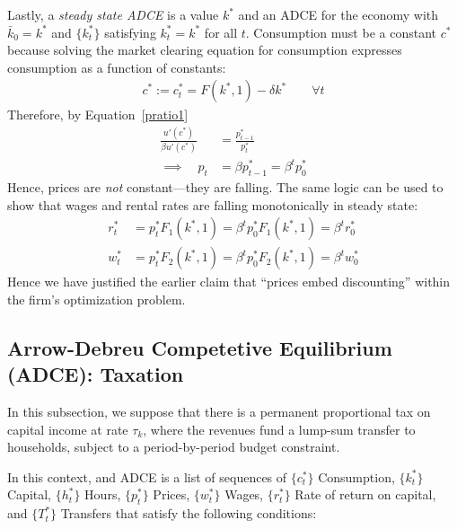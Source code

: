 \documentclass[12pt]{article}
\theoremstyle{plain}
\theoremstyle{definition}
\theoremstyle{remark}
\begin{document}
Lastly, a \emph{steady state ADCE} is a value $k^*$ and an ADCE for the
economy with $\bar{k}_0=k^*$ and $\{k_t^*\}$ satisfying $k^*_t=k^*$ for
all $t$. Consumption must be a constant $c^*$ because solving the market
clearing equation for consumption expresses consumption as a function of
constants:
\begin{align*}
  c^* := c_t^* = F(k^*,1) - \delta k^*
  \qquad \forall t
\end{align*}
Therefore, by Equation~\ref{pratio1}
\begin{align*}
  \frac{u'(c^*)}{\beta u'(c^*)} &= \frac{p_{t-1}^*}{p_t^*} \\
  \implies \quad p_t &= \beta p_{t-1}^* = \beta^t p_0^*
\end{align*}
Hence, prices are \emph{not} constant---they are falling. The same logic
can be used to show that wages and rental rates are falling
monotonically in steady state:
\begin{align*}
  r_t^* &= p_t^* F_1(k^*,1) = \beta^t p_0^* F_1(k^*,1) = \beta^t r_0^*\\
  w_t^* &= p_t^* F_2(k^*,1) = \beta^t p_0^* F_2(k^*,1) = \beta^t w_0^*
\end{align*}
Hence we have justified the earlier claim that ``prices embed
discounting'' within the firm's optimization problem.

\subsection{Arrow-Debreu Competetive Equilibrium (ADCE): Taxation}

In this subsection, we suppose that there is a permanent proportional
tax on capital income at rate $\tau_k$, where the revenues fund a
lump-sum transfer to households, subject to a period-by-period budget
constraint.

In this context, and ADCE is a list of sequences of
$\{c_t^*\}$  Consumption,
$\{k_t^*\}$  Capital,
$\{h_t^*\}$  Hours,
$\{p_t^*\}$  Prices,
$\{w_t^*\}$  Wages,
$\{r_t^*\}$  Rate of return on capital, and
$\{T_t^*\}$ Transfers
that satisfy the following conditions:
\end{document}
